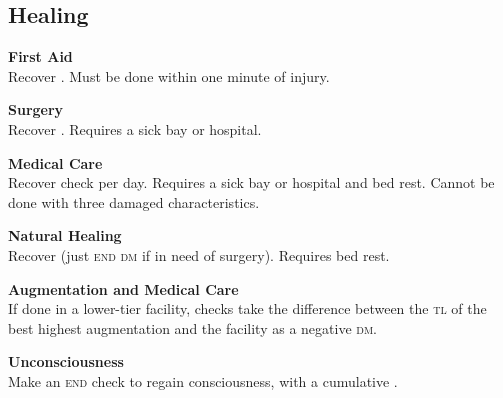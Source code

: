 \documentclass{cheatsheet}
\begin{document}
\begin{multicols}{2}
\vfill\columnbreak
\section{Healing}
\textbf{First Aid}\\
Recover .  Must be done within one minute of
injury.

\textbf{Surgery}\\
Recover .  Requires a sick bay or hospital.

\textbf{Medical Care}\\
Recover  check per day.  Requires a
sick bay or hospital and bed rest.  Cannot be done with three damaged
characteristics.

\textbf{Natural Healing}\\
Recover  (just \textsc{end dm} if in need of
surgery).  Requires bed rest.

\textbf{Augmentation and Medical Care}\\
If done in a lower-tier facility, checks take the difference between
the \textsc{tl} of the best highest augmentation and the facility as a
negative \textsc{dm}.

\textbf{Unconsciousness}\\
Make an \textsc{end} check to regain consciousness, with a cumulative
.
\end{multicols}
\end{document}
